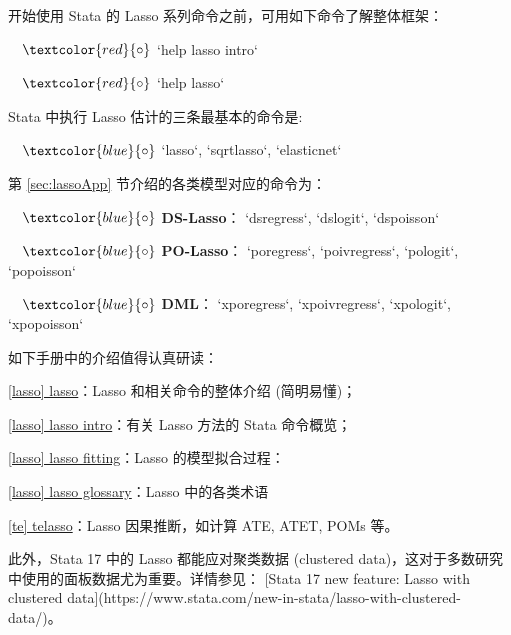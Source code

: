 {开始使用 Stata 的 Lasso 系列命令之前，可用如下命令了解整体框架：

\vspace{2pt}

$\quad \textcolor{red}{\circ}$ 
         `help lasso intro`
         
$\quad \textcolor{red}{\circ}$ 
         `help lasso`

\vspace{2pt} 


Stata 中执行 Lasso 估计的三条最基本的命令是:

\vspace{5pt}
$\quad \textcolor{blue}{\circ}$  
`lasso`, 
`sqrtlasso`, 
`elasticnet`

\vspace{5pt}
第 \ref{sec:lassoApp} 节介绍的各类模型对应的命令为：

\vspace{5pt}
$\quad \textcolor{blue}{\circ}$  
\textbf{DS-Lasso}：
   `dsregress`, 
   `dslogit`, 
   `dspoisson`

$\quad \textcolor{blue}{\circ}$ 
\textbf{PO-Lasso}：
   `poregress`, 
   `poivregress`, 
   `pologit`, 
   `popoisson`

$\quad \textcolor{blue}{\circ}$ 
\textbf{DML}：
   `xporegress`, 
   `xpoivregress`, 
   `xpologit`, 
   `xpopoisson`

\vspace{6pt}
\noindent
如下手册中的介绍值得认真研读：

\vspace{5pt}
\href{https://www.stata.com/manuals/lassolasso.pdf}{[lasso] lasso}：Lasso 和相关命令的整体介绍 (简明易懂)；

\href{https://www.stata.com/manuals/lassolasso intro.pdf}{[lasso] lasso intro}：有关 Lasso 方法的 Stata 命令概览；  

\href{https://www.stata.com/manuals/lassolassofitting.pdf#lassolassofitting}{[lasso] lasso fitting}：Lasso 的模型拟合过程：

\href{https://www.stata.com/manuals/lassolasso glossary.pdf}{[lasso] lasso glossary}：Lasso 中的各类术语 

\href{https://www.stata.com/manuals/tetelasso.pdf}{[te] telasso}：Lasso 因果推断，如计算 ATE, ATET, POMs 等。

\vspace{5pt}
此外，Stata 17 中的 Lasso 都能应对聚类数据 (clustered data)，这对于多数研究中使用的面板数据尤为重要。详情参见： [Stata 17 new feature: Lasso with clustered data](https://www.stata.com/new-in-stata/lasso-with-clustered-data/)。

}
